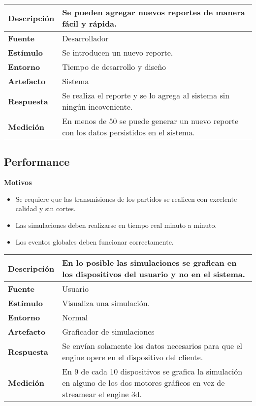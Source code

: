 \begin{center}
  \begin{tabular}{| l | p{10cm} | }
    \hline
	\textbf{Descripción} & Se pueden agregar nuevos reportes de manera fácil y rápida.\\  \hline
	\textbf{Fuente} & Desarrollador\\  \hline
	\textbf{Estímulo} & Se introducen un nuevo reporte.\\  \hline
	\textbf{Entorno} & Tiempo de desarrollo y diseño\\  \hline
	\textbf{Artefacto} & Sistema\\  \hline
	\textbf{Respuesta} & Se realiza el reporte y se lo agrega al sistema sin ningún incoveniente.\\  \hline
	\textbf{Medición} & En menos de 50 se puede generar un nuevo reporte con los datos persistidos en el sistema.\\  \hline
  \end{tabular}
\end{center}

\subsection{Performance}

\textbf{Motivos}
\begin{itemize}
\item Se requiere que las transmisiones de los partidos se realicen con excelente calidad y sin cortes.
\item Las simulaciones deben realizarse en tiempo real minuto a minuto.
\item Los eventos globales deben funcionar correctamente.
\end{itemize}


\begin{center}
  \begin{tabular}{| l | p{10cm} | }
    \hline
	\textbf{Descripción} & En lo posible las simulaciones se grafican en los dispositivos del usuario y no en el sistema.\\  \hline
	\textbf{Fuente} & Usuario\\  \hline
	\textbf{Estímulo} & Visualiza una simulación.\\  \hline
	\textbf{Entorno} & Normal\\  \hline
	\textbf{Artefacto} & Graficador de simulaciones\\  \hline
	\textbf{Respuesta} & Se envían solamente los datos necesarios para que el engine opere en el dispositivo del cliente.\\  \hline
	\textbf{Medición} & En 9 de cada 10 dispositivos se grafica la simulación en alguno de los dos motores gráficos en vez de streamear el engine 3d.\\  \hline
  \end{tabular}
\end{center} 

